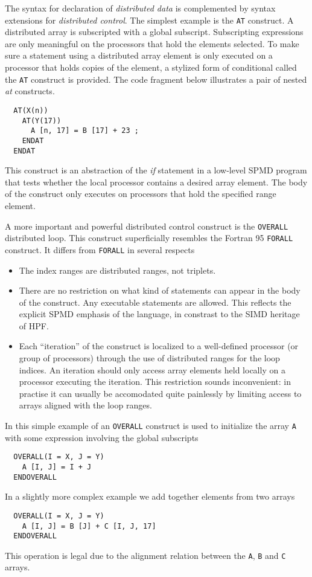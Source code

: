 The syntax for declaration of {\em distributed data} is complemented by
syntax extensions for {\em distributed control}.  The simplest
example is the {\tt AT} construct.
A distributed array is subscripted with a global subscript.
Subscripting expressions are only meaningful on the
processors that hold the elements selected.  To make
sure a statement using a distributed array element is
only executed on a processor
that holds copies of the element, a stylized form of conditional
called the {\tt AT} construct is provided.
The code fragment below illustrates a pair of nested {\em at} constructs.
\small
\begin{verbatim}
  AT(X(n))
    AT(Y(17))
      A [n, 17] = B [17] + 23 ;
    ENDAT
  ENDAT
\end{verbatim}
\normalsize
This construct is an abstraction of the {\em if}
statement in a low-level SPMD program that tests whether the local
processor contains a desired array element.  The body of the
construct only executes on processors that hold the specified
range element.

A more important and powerful distributed control construct is the
{\tt OVERALL} distributed loop.  This construct
superficially resembles the Fortran 95 {\tt FORALL} construct.
It differs from {\tt FORALL} in several respects
\begin{itemize}
\item
The index ranges are distributed ranges, not triplets.
\item
There are no restriction on what kind of statements can appear in the
body of the construct.  Any executable statements are allowed.
This reflects the explicit SPMD emphasis of the language, in constrast
to the SIMD heritage of HPF.
\item
Each ``iteration'' of the construct is localized to a well-defined processor
(or group of processors)
through the use of distributed ranges for the loop indices.  An iteration
should only access array elements held locally on a processor
executing the iteration.
This restriction sounds inconvenient: in practise it can usually be
accomodated quite painlessly by limiting access
to arrays aligned with the loop ranges.
\end{itemize}
In this simple example of an {\tt OVERALL} construct is used to
initialize the array {\tt A} with some expression involving
the global subscripts
\small
\begin{verbatim}
  OVERALL(I = X, J = Y)
    A [I, J] = I + J
  ENDOVERALL
\end{verbatim}
\normalsize
In a slightly more complex example we add together elements from two
arrays
\small
\begin{verbatim}
  OVERALL(I = X, J = Y)
    A [I, J] = B [J] + C [I, J, 17]
  ENDOVERALL
\end{verbatim}
\normalsize
This operation is legal due to the alignment relation between the
{\tt A}, {\tt B} and {\tt C} arrays.

